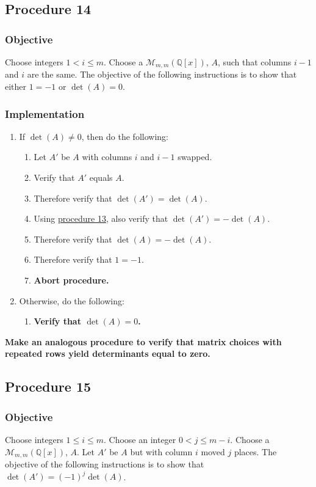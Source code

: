 \documentclass[twocolumn]{article}
\begin{document}
		\subsection{Procedure 14}\label{sec:procedure 14}
			\subsubsection{Objective}
				Choose integers $1<i\le m$. Choose a $\mathcal{M}_{m,m}(\mathbb{Q}[x])$, $A$, such that columns $i-1$ and $i$ are the same. The objective of the following instructions is to show that either $1=-1$ or $\det(A)=0$.
			\subsubsection{Implementation}
				\begin{enumerate}
					\item If $\det(A)\ne 0$, then do the following:
					\begin{enumerate}
						\item Let $A'$ be $A$ with columns $i$ and $i-1$ swapped.
						\item Verify that $A'$ equals $A$.
						\item Therefore verify that $\det(A')=\det(A)$.
						\item Using \hyperref[sec:procedure 13]{procedure 13}, also verify that $\det(A')=-\det(A)$.
						\item Therefore verify that $\det(A)=-\det(A)$.
						\item Therefore verify that $1=-1$.
						\item \textbf{Abort procedure.}
					\end{enumerate}
					\item Otherwise, do the following:
					\begin{enumerate}
						\item \textbf{Verify that $\det(A)=0$.}
					\end{enumerate}
				\end{enumerate}
			\textbf{Make an analogous procedure to verify that matrix choices with repeated rows yield determinants equal to zero.}
		\subsection{Procedure 15}\label{sec:procedure 15}
			\subsubsection{Objective}
				Choose integers $1\le i\le m$. Choose an integer $0<j\le m-i$. Choose a $\mathcal{M}_{m,m}(\mathbb{Q}[x])$, $A$. Let $A'$ be $A$ but with column $i$ moved $j$ places. The objective of the following instructions is to show that $\det(A')=(-1)^j\det(A)$.
\end{document}
